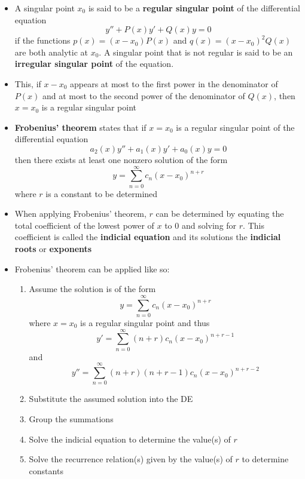 \documentclass{article}
\begin{document}
\begin{itemize}
  \item A singular point $x_0$ is said to be a \textbf{regular singular point} of the differential equation \[y'' + P(x) y' + Q(x) y = 0\] if the functions $p(x) = (x - x_0) P(x)$ and $q(x) = (x - x_0)^2 Q(x)$ are both analytic at $x_0$. A singular point that is not regular is said to be an \textbf{irregular singular point} of the equation.

  \item This, if $x - x_0$ appears at most to the first power in the denominator of $P(x)$ and at most to the second power of the denominator of $Q(x)$, then $x = x_0$ is a regular singular point

  \item \textbf{Frobenius' theorem} states that if $x = x_0$ is a regular singular point of the differential equation \[a_2(x) y'' + a_1(x) y' + a_0(x) y = 0\] then there exists at least one nonzero  solution of the form \[y = \sum_{n = 0}^\infty c_n (x - x_0)^{n + r}\] where $r$ is a constant to be determined

  \item When applying Frobenius' theorem, $r$ can be determined by equating the total coefficient of the lowest power of $x$ to $0$ and solving for $r$. This coefficient is called the \textbf{indicial equation} and its solutions the \textbf{indicial roots} or \textbf{exponents}

  \item Frobenius' theorem can be applied like so:

        \begin{enumerate}
\item Assume the solution is of the form \[y = \sum_{n = 0}^\infty c_n (x - x_0)^{n + r}\] where $x = x_0$ is a regular singular point and thus \[y' = \sum_{n = 0}^\infty (n + r) c_n (x - x_0)^{n + r - 1}\] and \[y'' = \sum_{n = 0}^\infty (n + r) (n + r - 1) c_n (x - x_0)^{n + r - 2}\]

          \item Substitute the assumed solution into the DE

          \item Group the summations

          \item Solve the indicial equation to determine the value(s) of $r$

          \item Solve the recurrence relation(s) given by the value(s) of $r$ to determine constants


\end{enumerate}
\end{itemize}
\end{document}
